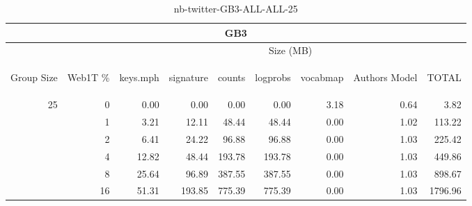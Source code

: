 \begin{center}
\begin{table}[htbp]
\begin{tabular}{ | r | r | r | r | r | r | r | r | r |}
\hline
\multicolumn{9}{|c|}{GB3}\\
\hline
 & & \multicolumn{7}{|c|}{Size (MB)}\\ \cline{3-9}
\begin{sideways}Group Size\end{sideways} & \begin{sideways}Web1T \% \end{sideways} & \begin{sideways}keys.mph\end{sideways} & \begin{sideways}signature\end{sideways} & \begin{sideways}counts\end{sideways} & \begin{sideways}logprobs\end{sideways} & \begin{sideways}vocabmap\end{sideways} & \begin{sideways}Authors Model \end{sideways} & \begin{sideways}TOTAL\end{sideways}\\
\hline
\multirow{5}{*}{25}
 & 0 & 0.00 & 0.00 & 0.00 & 0.00 & 3.18 & 0.64 & 3.82\\ \cline{2-9}
 & 1 & 3.21 & 12.11 & 48.44 & 48.44 & 0.00 & 1.02 & 113.22\\ \cline{2-9}
 & 2 & 6.41 & 24.22 & 96.88 & 96.88 & 0.00 & 1.03 & 225.42\\ \cline{2-9}
 & 4 & 12.82 & 48.44 & 193.78 & 193.78 & 0.00 & 1.03 & 449.86\\ \cline{2-9}
 & 8 & 25.64 & 96.89 & 387.55 & 387.55 & 0.00 & 1.03 & 898.67\\ \cline{2-9}
 & 16 & 51.31 & 193.85 & 775.39 & 775.39 & 0.00 & 1.03 & 1796.96\\ \cline{2-9}
\hline
\end{tabular}
\caption{nb-twitter-GB3-ALL-ALL-25}
\label{table:nb-twitter-GB3-ALL-ALL-25}
\end{table}
\end{center}


